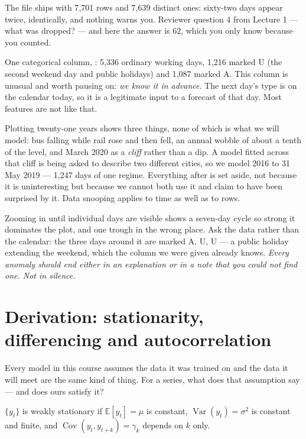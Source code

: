 \documentclass[11pt,a4paper]{article}
\begin{document}
The file ships with 7{,}701 rows and 7{,}639 distinct ones: sixty-two days
appear twice, identically, and nothing warns you. Reviewer question 4 from
Lecture 1 --- what was dropped? --- and here the answer is 62, which you only
know because you counted.

One categorical column, : 5{,}336 ordinary working days,
1{,}216 marked U (the second weekend day and public holidays) and 1{,}087
marked A. This column is unusual and worth pausing on: \emph{we know it in
advance}. The next day's type is on the calendar today, so it is a legitimate
input to a forecast of that day. Most features are not like that.

Plotting twenty-one years shows three things, none of which is what we will
model: bus falling while rail rose and then fell, an annual wobble of about a
tenth of the level, and March 2020 as a \emph{cliff} rather than a dip. A model
fitted across that cliff is being asked to describe two different cities, so we
model 2016 to 31 May 2019 --- 1{,}247 days of one regime. Everything after is
set aside, not because it is uninteresting but because we cannot both use it
and claim to have been surprised by it. Data snooping applies to time as well
as to rows.

Zooming in until individual days are visible shows a seven-day cycle so strong
it dominates the plot, and one trough in the wrong place. Ask the data rather
than the calendar: the three days around it are marked A, U, U --- a public
holiday extending the weekend, which the column we were given already knows.
\emph{Every anomaly should end either in an explanation or in a note that you
could not find one. Not in silence.}

\section{Derivation: stationarity, differencing and autocorrelation}

Every model in this course assumes the data it was trained on and the data it
will meet are the same kind of thing. For a series, what does that assumption
say --- and does ours satisfy it?

\begin{definition}
$\{y_t\}$ is weakly stationary if $\mathbb{E}[y_t] = \mu$ is constant,
$\operatorname{Var}(y_t) = \sigma^2$ is constant and finite, and
$\operatorname{Cov}(y_t, y_{t+k}) = \gamma_k$ depends on $k$ only.
\end{definition}
\end{document}
